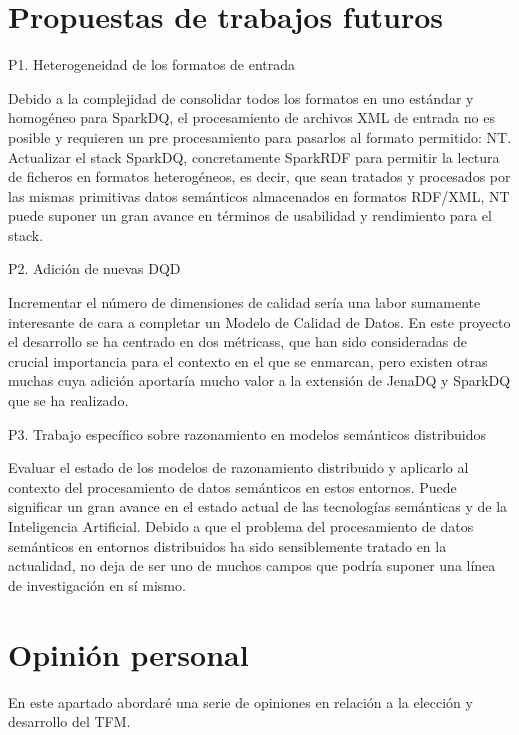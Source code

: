 \section{Propuestas de trabajos futuros}
\label{sec:ch6-future}
\begin{definitionlist}

\item[P1. Heterogeneidad de los formatos de entrada]

Debido a la complejidad de consolidar todos los
formatos en uno estándar y homogéneo para SparkDQ, el procesamiento de archivos
\acs{XML} de entrada no es posible y requieren un pre procesamiento para
pasarlos al formato permitido: \acs{NT}. Actualizar el stack SparkDQ, concretamente SparkRDF para permitir la lectura de
ficheros en formatos heterogéneos, es decir, que sean tratados y procesados por
las mismas primitivas datos semánticos almacenados en formatos
\acs{RDF}/\acs{XML}, \acs{NT} puede suponer un gran avance en términos de
usabilidad y rendimiento para el stack. 


\item[P2. Adición de nuevas \acs{DQD}]

Incrementar el número de dimensiones de calidad sería una labor sumamente
interesante de cara a completar un Modelo de Calidad de Datos. En este proyecto
el desarrollo se ha centrado en dos métricass, que han sido consideradas de
crucial importancia para el contexto en el que se enmarcan, pero existen otras
muchas cuya adición aportaría mucho valor a la extensión de JenaDQ y SparkDQ que se ha
realizado. 

\item[P3. Trabajo específico sobre razonamiento en modelos semánticos
  distribuidos]

Evaluar el estado de los modelos de razonamiento distribuido y aplicarlo al
contexto del procesamiento de datos semánticos en estos entornos. Puede
significar un gran avance en el estado actual de las tecnologías semánticas y de
la Inteligencia Artificial. Debido a que el problema del procesamiento de datos
semánticos en entornos distribuidos ha sido sensiblemente tratado en la
actualidad, no deja de ser uno de muchos campos que podría suponer una línea de
investigación en sí mismo. 

\end{definitionlist}


\section{Opinión personal}
En este apartado abordaré una serie de opiniones en relación a la elección y
desarrollo del \acs{TFM}.

